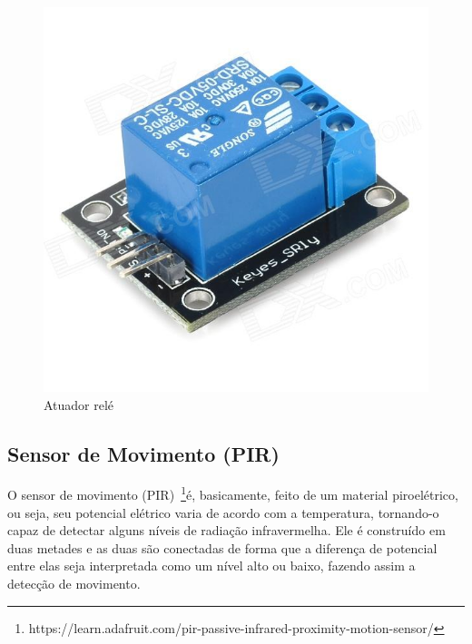 \begin{figure}[ht]
      \centering
      \includegraphics[scale=0.25]{figuras/Frele.jpg}
      \caption{Atuador relé}
      \label{fig:Arele}
\end{figure}


\subsection{Sensor de Movimento (PIR)}

O sensor de movimento (PIR)~\footnote{https://learn.adafruit.com/pir-passive-infrared-proximity-motion-sensor/}é, basicamente, feito de um material piroelétrico, ou seja, seu potencial elétrico varia de acordo com a temperatura, tornando-o capaz de detectar alguns níveis de radiação infravermelha. Ele é construído em duas metades e as duas são conectadas de forma que a diferença de potencial entre elas seja interpretada como um nível alto ou baixo, fazendo assim a detecção de movimento.

